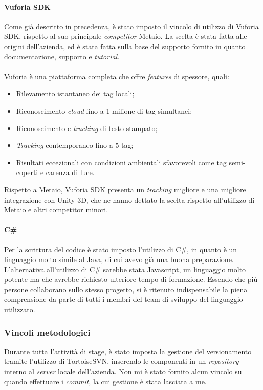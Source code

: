\paragraph{Vuforia SDK}
Come gi\`a descritto in precedenza, \`e stato imposto il vincolo di utilizzo di Vuforia SDK, rispetto al suo principale \textit{competitor} Metaio. La scelta \`e stata fatta alle origini dell'azienda, ed \`e stata fatta sulla base del supporto fornito in quanto documentazione, supporto e \textit{tutorial}.\\\\
Vuforia \`e una piattaforma completa che offre \textit{features} di spessore, quali:

\begin{itemize}
	\item Rilevamento istantaneo dei tag locali;
	\item Riconoscimento \textit{cloud} fino a 1 milione di tag simultanei;
	\item Riconoscimento e \textit{tracking} di testo stampato;
	\item \textit{Tracking} contemporaneo fino a 5 tag;
	\item Risultati eccezionali con condizioni ambientali sfavorevoli come tag semi-coperti e carenza di luce.
\end{itemize}
\noindent
Rispetto a Metaio, Vuforia SDK presenta un \textit{tracking} migliore e una migliore integrazione con Unity 3D, che ne hanno dettato la scelta rispetto all'utilizzo di Metaio e altri competitor minori. 


\paragraph{C\#}
Per la scrittura del codice \`e stato imposto l'utilizzo di C\#, in quanto \`e un linguaggio molto simile al Java, di cui avevo gi\`a una buona preparazione. L'alternativa all'utilizzo di C\# sarebbe stata Javascript, un linguaggio molto potente ma che avrebbe richiesto ulteriore tempo di formazione. Essendo che pi\`u persone collaborano sullo stesso progetto, si \`e ritenuto indispensabile la piena comprensione da parte di tutti i membri del team di sviluppo del linguaggio utilizzato.

\subsubsection{Vincoli metodologici}
Durante tutta l’attività di stage, \`e stato imposta la gestione del versionamento tramite l'utilizzo di TortoiseSVN, inserendo le componenti in un \textit{repository} interno al \textit{server} locale dell'azienda. Non mi \`e stato fornito alcun vincolo su quando effettuare i \textit{commit}, la cui gestione \`e stata lasciata a me.

